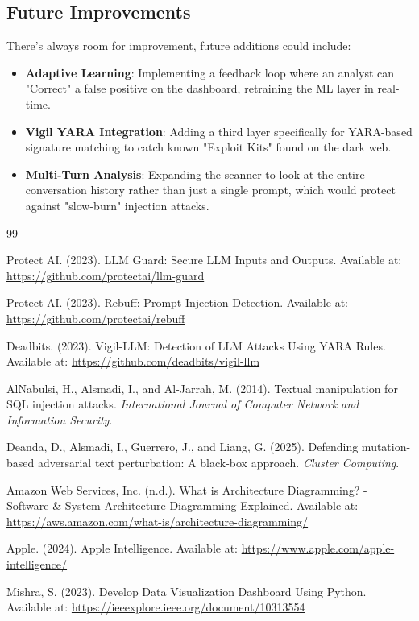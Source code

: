 \documentclass{article}
\begin{document}
\subsection{Future Improvements}
There's always room for improvement, future additions could include:
\begin{itemize}
    \item \textbf{Adaptive Learning}: Implementing a feedback loop where an analyst can "Correct" a false positive on the dashboard, retraining the ML layer in real-time.
    \item \textbf{Vigil YARA Integration}: Adding a third layer specifically for YARA-based signature matching to catch known "Exploit Kits" found on the dark web.
    \item \textbf{Multi-Turn Analysis}: Expanding the scanner to look at the entire conversation history rather than just a single prompt, which would protect against "slow-burn" injection attacks.
\end{itemize}

\begin{thebibliography}{99}

Protect AI. (2023).
LLM Guard: Secure LLM Inputs and Outputs.
Available at: \url{https://github.com/protectai/llm-guard}

Protect AI. (2023).
Rebuff: Prompt Injection Detection.
Available at: \url{https://github.com/protectai/rebuff}

Deadbits. (2023).
Vigil-LLM: Detection of LLM Attacks Using YARA Rules.
Available at: \url{https://github.com/deadbits/vigil-llm}

AlNabulsi, H., Alsmadi, I., and Al-Jarrah, M. (2014).
Textual manipulation for SQL injection attacks.
\textit{International Journal of Computer Network and Information Security}.

Deanda, D., Alsmadi, I., Guerrero, J., and Liang, G. (2025).
Defending mutation-based adversarial text perturbation: A black-box approach.
\textit{Cluster Computing}.

Amazon Web Services, Inc. (n.d.).
What is Architecture Diagramming? - Software \& System Architecture Diagramming Explained.
Available at: \url{https://aws.amazon.com/what-is/architecture-diagramming/}

Apple. (2024).
Apple Intelligence.
Available at: \url{https://www.apple.com/apple-intelligence/}

Mishra, S. (2023).
Develop Data Visualization Dashboard Using Python.
Available at: \url{https://ieeexplore.ieee.org/document/10313554}

\end{thebibliography}
\end{document}
